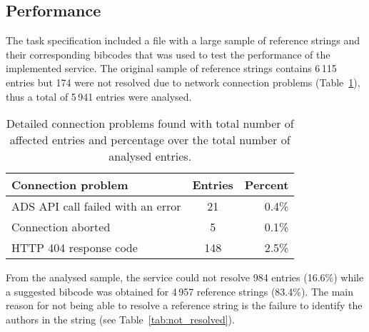 \documentclass[a4paper,10pt,twoside]{article}
\begin{document}
\subsection{Performance}

The task specification included a file with a large sample of reference strings and their corresponding bibcodes that was used to test the performance of the implemented service.  The original sample of reference strings contains 6\,115 entries but 174 were not resolved due to network connection problems (Table~\ref{tab:connection_problems}), thus a total of 5\,941 entries were analysed. 

\begin{table}[H]
    \begin{centering}
        \begin{center}
            \begin{tabular}{l|c|r}
            \scriptsize{\textbf{Connection problem}} & \scriptsize{\textbf{Entries}} & \scriptsize{\textbf{Percent}} \\
            \hline
			ADS API call failed with an error                   &   21  &  0.4\% \\
			Connection aborted  &    5  &   0.1\% \\
			HTTP 404 response code                         &  148  &  2.5\% \\
            \end{tabular}
        \end{center}

        \par
    \end{centering}
    \caption{Detailed connection problems found with total number of affected entries and percentage over the total number of analysed entries.}
    \label{tab:connection_problems}
\end{table}

From the analysed sample, the service could not resolve 984 entries (16.6\%) while a suggested bibcode was obtained for 4\,957 reference strings (83.4\%). The main reason for not being able to resolve a reference string is the failure to identify the authors in the string (see Table~\ref{tab:not_resolved}).
\end{document}
